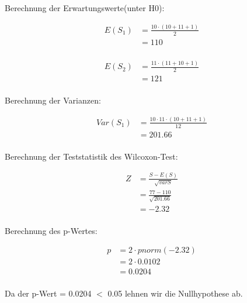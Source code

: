 \documentclass[a4paper,12pt]{article}
\begin{document}
Berechnung der Erwartungswerte(unter H0):

\begin{align*}
E(S_1)
&= \frac{10\cdot(10+11+1)}{2} \\
&=  110\\
\end{align*}

\begin{align*}
E(S_2)
&= \frac{11\cdot(11+10+1)}{2} \\
&=  121\\
\end{align*}

Berechnung der Varianzen:

\begin{align*}
Var(S_1)
&= \frac{10\cdot 11 \cdot (10+11+1)}{12} \\
&=  201.66 \\
\end{align*}


Berechnung der Teststatistik des Wilcoxon-Test:

\begin{align*}
Z
&= \frac{S-E(S)}{\sqrt{varS}} \\
&= \frac{77-110}{\sqrt{201.66}}  \\
&=  -2.32 \\
\end{align*}

Berechnung des p-Wertes:

\begin{align*}
p
&= 2 \cdot pnorm(-2.32) \\
&= 2 \cdot 0.0102  \\
&= 0.0204 \\
\end{align*}

Da der p-Wert = 0.0204 $<$ 0.05 lehnen wir die Nullhypothese ab.

	
	
\end{document}
